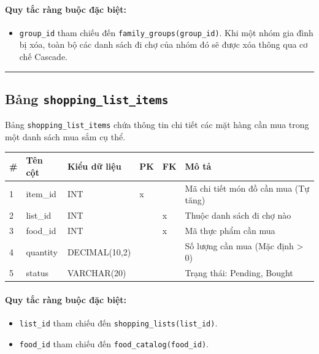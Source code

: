 \documentclass[12pt,a4paper]{article}
\begin{document}
\paragraph{Quy tắc ràng buộc đặc biệt:}
\begin{itemize}
    \item \texttt{group\_id} tham chiếu đến \texttt{family\_groups(group\_id)}. Khi một nhóm gia đình bị xóa, toàn bộ các danh sách đi chợ của nhóm đó sẽ được xóa thông qua cơ chế Cascade.
\end{itemize}

\vskip 0.5cm
\noindent\rule{\textwidth}{0.5pt}
\vskip 0.5cm

\subsection{Bảng \texttt{shopping\_}\allowbreak\texttt{list\_}\allowbreak\texttt{items}}
Bảng \texttt{shopping\_}\allowbreak\texttt{list\_}\allowbreak\texttt{items} chứa thông tin chi tiết các mặt hàng cần mua trong một danh sách mua sắm cụ thể.

\begin{longtable}{|p{0.5cm}|p{3.4cm}|p{3.2cm}|p{0.7cm}|p{0.7cm}|p{3.6cm}|}
\hline
\textbf{\#} & \textbf{Tên cột} & \textbf{Kiểu dữ liệu} & \textbf{PK} & \textbf{FK} & \textbf{Mô tả} \\ \hline
\endhead
1 & item\_id & INT & x & & Mã chi tiết món đồ cần mua (Tự tăng) \\ \hline
2 & list\_id & INT & & x & Thuộc danh sách đi chợ nào \\ \hline
3 & food\_id & INT & & x & Mã thực phẩm cần mua \\ \hline
4 & quantity & DECIMAL(10,2) & & & Số lượng cần mua (Mặc định > 0) \\ \hline
5 & status & VARCHAR(20) & & & Trạng thái: Pending, Bought \\ \hline
\end{longtable}

\paragraph{Quy tắc ràng buộc đặc biệt:}
\begin{itemize}
    \item \texttt{list\_id} tham chiếu đến \texttt{shopping\_lists(list\_id)}.
    \item \texttt{food\_id} tham chiếu đến \texttt{food\_catalog(food\_id)}.
\end{itemize}
\end{document}
